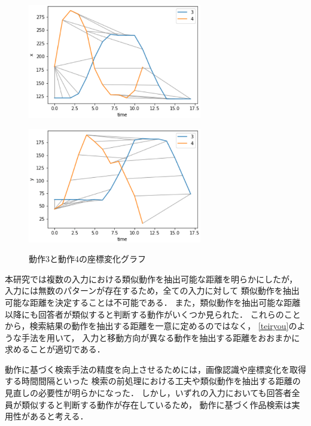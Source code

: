 \documentclass[11pt]{jreport}
\begin{document}
\begin{figure}[H]
    \centering
    \begin{minipage}{0.45\linewidth}
        \centering
        \includegraphics[height=5cm]{3-4-x.eps}
        \label{3-4-x}
    \end{minipage}
    \hspace{0.04\columnwidth}
    \begin{minipage}{0.45\linewidth}
        \centering
        \includegraphics[height=5cm]{3-4-y.eps}
        \label{3-4-y}
    \end{minipage}
    \hspace{0.04\columnwidth}
    \caption{動作3と動作4の座標変化グラフ}
    \label{3-4}
\end{figure}

本研究では複数の入力における類似動作を抽出可能な距離を明らかにしたが，
入力には無数のパターンが存在するため，全ての入力に対して
類似動作を抽出可能な距離を決定することは不可能である．
また，類似動作を抽出可能な距離以降にも回答者が類似すると判断する動作がいくつか見られた．
これらのことから，検索結果の動作を抽出する距離を一意に定めるのではなく，
\ref{teiryou}のような手法を用いて，
入力と移動方向が異なる動作を抽出する距離をおおまかに求めることが適切である．

動作に基づく検索手法の精度を向上させるためには，画像認識や座標変化を取得する時間間隔といった
検索の前処理における工夫や類似動作を抽出する距離の見直しの必要性が明らかになった．
しかし，いずれの入力においても回答者全員が類似すると判断する動作が存在しているため，
動作に基づく作品検索は実用性があると考える．
\end{document}
